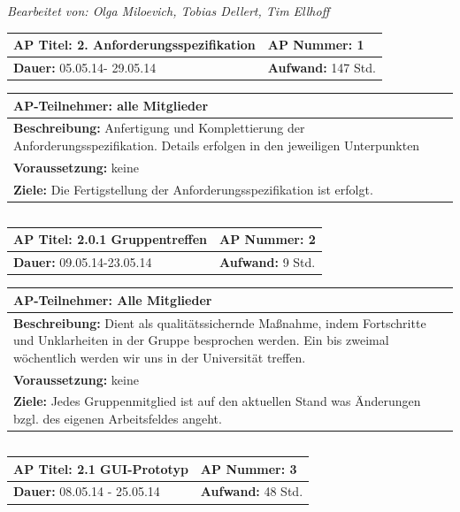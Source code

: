 \documentclass[fontsize=12pt,paper=a4,twoside]{scrartcl}
\begin{document}
\textit{Bearbeitet von: Olga Miloevich, Tobias Dellert, Tim Ellhoff}\\

\begin{tabular}{|p{7.43cm}|p{7.43cm}|}
\hline
\textbf{AP Titel: }2. Anforderungsspezifikation & \textbf{AP Nummer:} 1 \\ 
\hline
\textbf{Dauer: } 05.05.14- 29.05.14 & \textbf{Aufwand: }147 Std.\\
\hline
\end{tabular}
\begin{tabular}{|p{15.3cm}|}
\hline
\textbf{AP-Teilnehmer: } alle Mitglieder\\
\hline
\textbf{Beschreibung: }Anfertigung und Komplettierung der Anforderungsspezifikation. Details erfolgen in den jeweiligen Unterpunkten\\
\hline
\textbf{Voraussetzung: }keine \\
\hline 
\textbf{Ziele: }Die Fertigstellung der Anforderungsspezifikation ist erfolgt.\\
\hline 
\end{tabular}
\begin{verbatim}

\end{verbatim}
\begin{tabular}{|p{7.43cm}|p{7.43cm}|}
\hline
\textbf{AP Titel: } 2.0.1 Gruppentreffen & \textbf{AP Nummer:} 2 \\ 
\hline
\textbf{Dauer: }09.05.14-23.05.14 & \textbf{Aufwand: }9 Std.\\
\hline
\end{tabular}
\begin{tabular}{|p{15.3cm}|}
\hline
\textbf{AP-Teilnehmer: } Alle Mitglieder\\
\hline
\textbf{Beschreibung: }Dient als qualitätssichernde Maßnahme,
indem Fortschritte und Unklarheiten in der Gruppe besprochen werden.
Ein bis zweimal wöchentlich werden wir uns in der Universität treffen.\\
\hline
\textbf{Voraussetzung: }keine\\
\hline 
\textbf{Ziele: }Jedes Gruppenmitglied ist auf den aktuellen Stand was Änderungen bzgl. des eigenen Arbeitsfeldes angeht.\\
\hline 
\end{tabular}
\begin{verbatim}

\end{verbatim}
\begin{tabular}{|p{7.43cm}|p{7.43cm}|}
\hline
\textbf{AP Titel: }2.1 GUI-Prototyp & \textbf{AP Nummer: }3 \\ 
\hline
\textbf{Dauer: }08.05.14 - 25.05.14 & \textbf{Aufwand: }48 Std.\\
\hline
\end{tabular}
\end{document}
